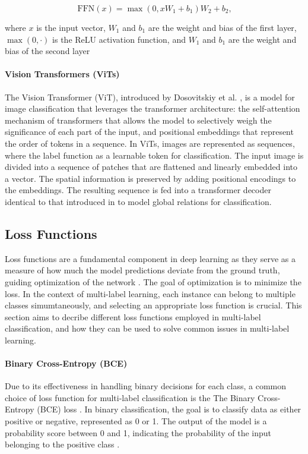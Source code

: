 \documentclass[lettersize,journal]{IEEEtran}
\begin{document}
\begin{equation}
    \label{eq:ffn}
    \text{FFN}(x) = \max(0, xW_1 + b_1)W_2 + b_2\text{,}
\end{equation}

where $x$ is the input vector, $W_1$ and $b_1$ are the weight and bias of the first layer, $\max(0,\cdot)$ is the ReLU activation function, and $W_1$ and $b_1$ are the weight and bias of the second layer

\paragraph{Vision Transformers (ViTs)}
The Vision Transformer (ViT), introduced by Dosovitskiy et al. \cite{dosovitskiy2021imageworth16x16words}, is a model for image classification that leverages the transformer architecture: the self-attention mechanism of transformers that allows the model to selectively weigh the significance of each part of the input, and positional embeddings that represent the order of tokens in a sequence. In ViTs, images are represented as sequences, where the label function as a learnable token for classification. The input image is divided into a sequence of patches that are flattened and linearly embedded into a vector. The spatial information is preserved by adding positional encodings to the embeddings. The resulting sequence is fed into a transformer decoder identical to that introduced in \cite{vaswani2023attentionneed} to model global relations for classification.

\subsection{Loss Functions}
Loss functions are a fundamental component in deep learning as they serve as a measure of how much the model predictions deviate from the ground truth, guiding optimization of the network \cite{zhang2023dive}. The goal of optimization is to minimize the loss. In the context of multi-label learning, each instance can belong to multiple classes simumtaneously, and selecting an appropriate loss function is crucial. This section aims to decribe different loss functions employed in multi-label classification, and how they can be used to solve common issues in multi-label learning.

\paragraph{Binary Cross-Entropy (BCE)}
Due to its effectiveness in handling binary decisions for each class, a common choice of loss function for multi-label classification is the The Binary Cross-Entropy (BCE) loss \cite{mlsp,durand2019learningdeepconvnetmultilabel,nayan2024binary}. In binary classification, the goal is to classify data as either positive or negative, represented as 0 or 1. The output of the model is a probability score between 0 and 1, indicating the probability of the input belonging to the positive class \cite{nayan2024binary}.
\end{document}

